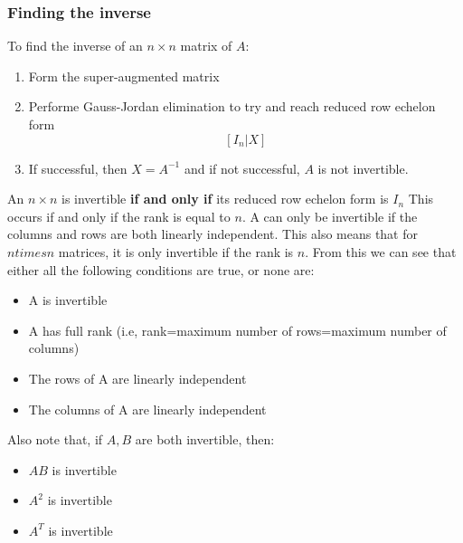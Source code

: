 \documentclass[11pt]{book}
\begin{document}
{{\subsubsection{Finding the inverse}
\par{To find the inverse of an $n\times n$ matrix of  $A$:
\begin{enumerate}
	\item{Form the super-augmented matrix}
	\item{Performe Gauss-Jordan elimination to try and reach reduced row echelon form \[
			\left[I_{n}|X\right]
	\] }
	\item{If successful, then $X=A^{-1}$ and if not successful, $A$ is not invertible.}
\end{enumerate}
An $n\times n$ is invertible  \textbf{if and only if} its reduced row echelon form is $I_{n}$ This occurs if and only if the rank is equal to $n$. A can only be invertible if the columns and rows are both linearly independent. This also means that for $n
times n$ matrices, it is only invertible if the rank is $n$. From this we can see that either all the following conditions are true, or none are: 
\begin{itemize}
	\item{A is invertible}
	\item{A has full rank (i.e, rank=maximum number of rows=maximum number of columns)}
	\item{The rows of A are linearly independent}
	\item{The columns of A are linearly independent}
\end{itemize}
Also note that, if $A, B$ are both invertible, then:
\begin{itemize}
	\item{$AB$ is invertible}
	\item{$A^{2}$ is invertible}
	\item{$A^{T}$ is invertible}	
\end{itemize}
}
}}
\end{document}
